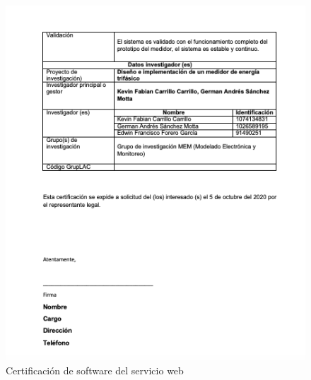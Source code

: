 \begin{appendix}
\begin{figure}[H]
    \includegraphics[width = 14cm]{Anexos/api-2.png}
    \caption{Certificación de software del servicio web} 
    \label{fig:api2}
\end{figure}


\end{appendix}
